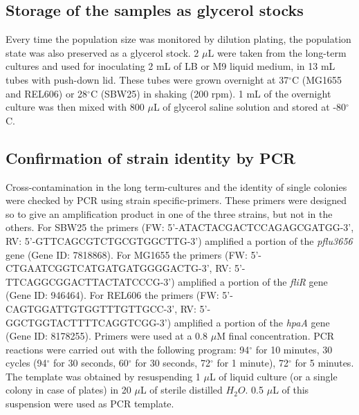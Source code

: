 \documentclass[
    11pt,
    a4paper,
    twoside
]{article} %
\begin{document}
\begin{multicols}{2}
\subsection*{Storage of the samples as glycerol stocks}
Every time the population size was monitored by dilution plating, the population state was also preserved as a glycerol stock.
2 $\mu$L were taken from the long-term cultures and used for inoculating 2 mL of LB or M9 liquid medium, in 13 mL tubes with push-down lid.
These tubes were grown overnight at 37$^\circ$C (MG1655 and REL606) or 28$^\circ$C (SBW25) in shaking (200 rpm).
1 mL of the overnight culture was then mixed with 800 $\mu$L of glycerol saline solution and stored at -80$^\circ$C.

\subsection*{Confirmation of strain identity by PCR}
Cross-contamination in the long term-cultures and the identity of single colonies were checked by PCR using strain specific-primers.
These primers were designed so to give an amplification product in one of the three strains, but not in the others.
For SBW25 the primers (FW: 5’-ATACTACGACTCCAGAGCGATGG-3', RV: 5’-GTTCAGCGTCTGCGTGGCTTG-3') amplified a portion of the \textit{pflu3656} gene (Gene ID: 7818868).
For MG1655 the primers (FW: 5’-CTGAATCGGTCATGATGATGGGGACTG-3', RV: 5’-TTCAGGCGGACTTACTATCCCG-3') amplified a portion of the \textit{fliR} gene (Gene ID: 946464).
For REL606 the primers (FW: 5’-CAGTGGATTGTGGTTTGTTGCC-3', RV: 5’-GGCTGGTACTTTTCAGGTCGG-3') amplified a portion of the \textit{hpaA} gene (Gene ID: 8178255).
Primers were used at a 0.8 $\mu$M final concentration.
PCR reactions were carried out with the following program: 94$^\circ$ for 10 minutes, 30 cycles (94$^\circ$ for 30 seconds, 60$^\circ$ for 30 seconds, 72$^\circ$ for 1 minute), 72$^\circ$ for 5 minutes.
The template was obtained by resuspending 1 $\mu$L of liquid culture (or a single colony in case of plates) in 20 $\mu$L of sterile distilled $H_2O$.
0.5 $\mu$L of this suspension were used as PCR template.

\footnotesize


\end{multicols}
\end{document}
